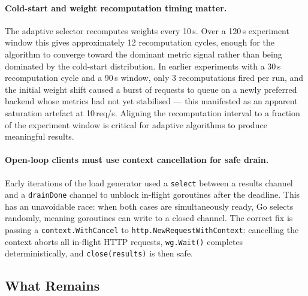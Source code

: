 \documentclass[12pt]{article}
\begin{document}
\paragraph{Cold-start and weight recomputation timing matter.}
The adaptive selector recomputes weights every 10\,s. Over a 120\,s experiment
window this gives approximately 12 recomputation cycles, enough for the
algorithm to converge toward the dominant metric signal rather than being
dominated by the cold-start distribution. In earlier experiments with a
30\,s recomputation cycle and a 90\,s window, only 3 recomputations fired
per run, and the initial weight shift caused a burst of requests to queue on
a newly preferred backend whose metrics had not yet stabilised --- this
manifested as an apparent saturation artefact at 10\,req/s. Aligning the
recomputation interval to a fraction of the experiment window is critical for
adaptive algorithms to produce meaningful results.

\paragraph{Open-loop clients must use context cancellation for safe drain.}
Early iterations of the load generator used a \texttt{select} between a
results channel and a \texttt{drainDone} channel to unblock in-flight goroutines
after the deadline. This has an unavoidable race: when both cases are
simultaneously ready, Go selects randomly, meaning goroutines can write to a
closed channel. The correct fix is passing a \texttt{context.WithCancel} to
\texttt{http.NewRequestWithContext}: cancelling the context aborts all in-flight
HTTP requests, \texttt{wg.Wait()} completes deterministically, and
\texttt{close(results)} is then safe.

\subsection{What Remains}
\end{document}
